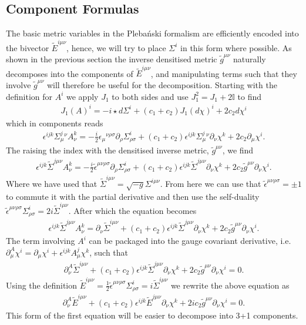 \documentclass[10pt]{report}
\newcommand{\pleb}[0]{Pleba\'nski}
\theoremstyle{definition}
\newcommand{\teps}[0]{\tilde{\epsilon}}
\newcommand{\tE}[0]{\tilde{E}}
\newcommand{\tg}[0]{\tilde{g}}
\newcommand{\tsd}[0]{\tilde{\Sigma}}
\begin{document}
    \subsection{Component Formulas}
    The basic metric variables in the \pleb{}  formalism are efficiently encoded into the bivector $\tE^{i\mu\nu}$, hence, we will try to place $\Sigma^i$ in this form where possible. As shown in the previous section the inverse densitised metric $\tg^{\mu\nu}$ naturally decomposes into the components of $\tE^{i\mu\nu}$, and manipulating terms such that they involve $\tg^{\mu\nu}$ will therefore be useful for the decomposition. Starting with the definition for $A^i$ we apply $J_1$ to both sides and use $J^2_1 = J_1 + 2 \mathbb{I}$ to find 
    \begin{align}
        J_1(A)^i = -i \star d\Sigma^i + (c_1 + c_2) J_1(d\chi)^i + 2c_2 d\chi^i
    \end{align}
    which in components reads 
    \begin{align}
            \epsilon^{ijk} \Sigma^j_\mu{}^\nu A^k_\nu = -\frac{i}{2} \epsilon_\mu{}^{\nu\rho\sigma} \partial_\rho \Sigma^i_{\rho\sigma} + (c_1 + c_2) \epsilon^{ijk} \Sigma^j_\mu{}^\nu \partial_\nu \chi^k + 2c_2 \partial_\mu \chi^i.
        \end{align}
    The raising the index with the densitised inverse metric, $\tg^{\mu\nu}$, we find
    \begin{align}
            \epsilon^{ijk} \tsd^{j\mu\nu} A^k_\nu = -\frac{i}{2} \teps^{\mu\nu\rho\sigma} \partial_\rho \Sigma^i_{\rho\sigma} + (c_1 + c_2) \epsilon^{ijk} \tsd^{j\mu\nu} \partial_\nu \chi^k + 2c_2 \tg^{\mu\nu} \partial_\nu \chi^i.
    \end{align}
    Where we have used that $\tsd^{i\mu\nu} = \sqrt{-g} \Sigma^{i\mu\nu}$. From here we can use that $\teps^{\mu\nu\rho\sigma} = \pm 1$ to commute it with the partial derivative and then use the self-duality $\teps^{\mu\nu\rho\sigma} \Sigma^i_{\rho\sigma} = 2i \tsd^{i\mu\nu}$. After which the equation becomes 
    \begin{align}
            \epsilon^{ijk} \tsd^{j\mu\nu} A^k_\nu = \partial_\nu \tsd^{i\mu\nu} + (c_1 + c_2) \epsilon^{ijk} \tsd^{j\mu\nu} \partial_\nu \chi^k + 2c_2 \tg^{\mu\nu} \partial_\nu \chi^i.
    \end{align}
    The term involving $A^i$ can be packaged into the gauge covariant derivative, i.e. $\partial^A_\mu \chi^i = \partial_\mu \chi^i + \epsilon^{ijk} A^j_\mu \chi^k$, such that
    \begin{align}
        \partial^A_\nu \tsd^{i\mu\nu} + (c_1 + c_2) \epsilon^{ijk} \tsd^{j\mu\nu} \partial_\nu \chi^k + 2c_2 \tg^{\mu\nu} \partial_\nu \chi^i = 0.
    \end{align}
    Using the definition $\tE^{i\mu\nu} = \frac{1}{2} \teps^{\mu\nu\rho\sigma} \Sigma^i_{\rho\sigma} = i \tsd^{i\mu\nu}$ we rewrite the above equation as 
    \begin{align}
            \partial^A_\nu \tE^{i\mu\nu} + (c_1 + c_2) \epsilon^{ijk} \tE^{j\mu\nu} \partial_\nu \chi^k + 2 i c_2 \tg^{\mu\nu} \partial_\nu \chi^i = 0.
    \end{align}
    This form of the first equation will be easier to decompose into 3+1 components.
\end{document}
